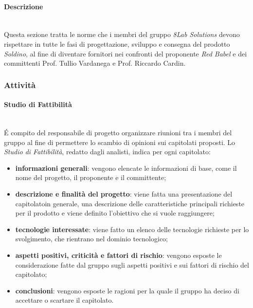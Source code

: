 \paragraph{Descrizione} \mbox{}\\ 

\noindent Questa sezione tratta le norme che i membri del gruppo \textit{8Lab Solutions} 
devono rispettare in tutte le fasi di progettazione, sviluppo e consegna del 
prodotto \textit{Soldino}, al fine di diventare fornitori nei confronti del 
proponente \textit{Red Babel} e dei committenti Prof. Tullio Vardanega e Prof. 
Riccardo Cardin.

\subsubsection{Attività}

\paragraph{Studio di Fattibilità} \mbox{}\\ 

\noindent \'E compito del responsabile di progetto organizzare riunioni tra i membri del 
gruppo al fine di permettere lo scambio di opinioni sui capitolati proposti.
Lo \textit{Studio di Fattibilità}, redatto dagli analisti, indica per ogni 
capitolato\glo:
	\begin{itemize}
		\item \textbf{informazioni generali}: vengono elencate le informazioni di 
			base, come il nome del progetto, il proponente e il committente;
		\item \textbf{descrizione e finalità del progetto}: viene fatta una 
			presentazione del capitolato\glosp in generale, una descrizione delle 
			caratteristiche principali richieste per il prodotto e viene definito 
			l'obiettivo che si vuole raggiungere;
		\item \textbf{tecnologie interessate}: viene fatto un elenco delle tecnologie 
			richieste per lo svolgimento, che rientrano nel dominio tecnologico;
		\item \textbf{aspetti positivi, criticità e fattori di rischio}: vengono 
			esposte le considerazione fatte dal gruppo sugli aspetti positivi e sui fattori 
			di rischio del capitolato\glo;
		\item \textbf{conclusioni}: vengono esposte le ragioni per la quale il gruppo 
			ha deciso di accettare o scartare il capitolato\glo.
	\end{itemize}
		
